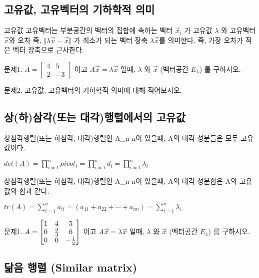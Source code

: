 


\subsection{고유값, 고유벡터의 기하학적 의미}


\begin{theorem}

고유값 고유벡터는 부분공간의 벡터의 집합에 속하는 벡터 $\vec{x}_i$ 가 고유값 $\lambda$ 와 고유벡터 $\vec{v}$와 오차 즉, $\Vert \lambda\vec{v} - \vec{x} \Vert$ 가 최소가 되는 벡터 장축 $\lambda\vec{x}$를 의미한다. 즉, 가장 오차가 적은 벡터 장축으로 근사한다.

\end{theorem}

\newpage
문제1. $A=\begin{bmatrix}4 & 5 \\ 2 & -3\end{bmatrix}$ 이고 $A\vec{x} = \lambda\vec{x}$ 일때, $\lambda$ 와 $\vec{x}$ (벡터공간 $E_{\lambda}$) 를 구하시오.

문제2. 고유값, 고유벡터의 기하학적 의미에 대해 적어보시오.
\newpage
\subsection{상(하)삼각(또는 대각)행렬에서의 고유값}

\begin{theorem}
상삼각행렬(또는 하삼각, 대각)행렬인 A_{n \times n}이 있을때, A의 대각 성분들은 모두 고유값이다.

$det(A) = \prod_{i=1}^{n} {pivot_i} = \prod_{i=1}^{n} {d_i} = \prod_{i=1}^{n} {\lambda_i}$
\end{theorem}

\begin{theorem}
상삼각행렬(또는 하삼각, 대각)행렬인 A_{n \times n}이 있을때, A의 대각 성분합은 A의 고유값의 합과 같다.

$tr(A) = \sum_{i=1}^{n} a_{ii} = (a_{11} + a_{22} + \cdots + a_{nn}) = \sum_{i=1}^n\lambda_{i}$
\end{theorem}


\newpage
문제1. $A=\begin{bmatrix} 1&4&5 \\ 0&{3\over 4}&6 \\ 0&0&-{1 \over 2} \end{bmatrix}$ 이고 $A\vec{x} = \lambda\vec{x}$ 일때, $\lambda$ 와 $\vec{x}$ (벡터공간 $E_{\lambda}$) 를 구하시오.
\newpage
\subsection{닮음 행렬 (Similar matrix)}

